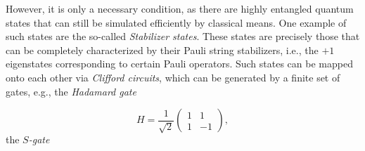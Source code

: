 \documentclass[../main.tex]{subfiles}
\begin{document}
However, it is only a necessary condition, as there are highly entangled quantum states that can still be simulated efficiently by classical means. One example of such states are the so-called \textit{Stabilizer states}. These states are precisely those that can be completely characterized by their Pauli string stabilizers, i.e., the $+1$ eigenstates corresponding to certain Pauli operators. Such states can be mapped onto each other via \textit{Clifford circuits}, which can be generated by a finite set of gates, e.g., the \textit{Hadamard gate}

\begin{equation}
    H = \frac{1}{\sqrt{2}}
    \begin{pmatrix}
        1 & 1 \\
        1 & -1
    \end{pmatrix},
\end{equation} the $S$\textit{-gate}
\end{document}
